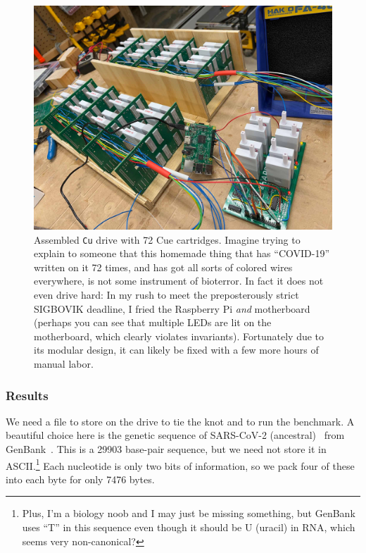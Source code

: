\documentclass[twocolumn]{article}
\begin{document}
\begin{figure}
  \includegraphics[width=\columnwidth]{cu}
  \caption{
    Assembled {\tt Cu} drive with 72 Cue cartridges. Imagine
    trying to explain to someone that this homemade thing
    that has ``COVID-19'' written on it 72 times, and
    has got all sorts of colored wires everywhere, is not
    some instrument of bioterror. In fact it does not even
    drive hard: In my rush to meet the preposterously strict
    SIGBOVIK deadline, I fried the Raspberry Pi {\em and}
    motherboard (perhaps you can see that multiple LEDs are
    lit on the motherboard, which clearly violates invariants).
    Fortunately due to its modular design, it can likely be fixed
    with a few more hours of manual labor.
  } \label{fig:cu}
\end{figure}

\subsubsection{Results}

We need a file to store on the drive to tie the knot and to run the
benchmark. A beautiful choice here is the genetic sequence of
SARS-CoV-2 (ancestral)~\cite{sarsncov2sequence} from
GenBank~\cite{clark2016genbank}. This is a 29903 base-pair sequence,
but we need not store it in ASCII.\footnote{Plus, I'm a biology noob
  and I may just be missing something, but GenBank uses ``T'' in
  this sequence even though it should be U (uracil) in RNA, which seems
  very non-canonical?} Each nucleotide is only two bits of information,
so we pack four of these into each byte for only 7476 bytes.
\end{document}
